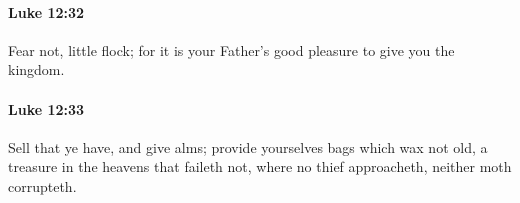 		\paragraph{Luke 12:32} %
			\label{LUKE-12-32}

			Fear not, little flock; for it is your Father's good pleasure to give you the kingdom.

			\begin{framed}
			\scriptsize
				\begin{compactdesc}
					\item[SBLG] 
				\end{compactdesc}
			\end{framed}

		\paragraph{Luke 12:33} %
			\label{LUKE-12-33}

			Sell that ye have, and give alms; provide yourselves bags which wax not old, a treasure in the heavens that faileth not, where no thief approacheth, neither moth corrupteth.

